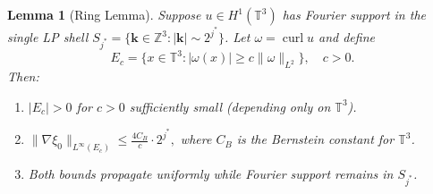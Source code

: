 \documentclass[11pt]{article}
\newtheorem{lemma}[theorem]{Lemma}
\begin{document}
\begin{lemma}[Ring Lemma]\label{lem:ring}
Suppose $u\in H^1(\mathbb{T}^3)$ has Fourier support in the single LP shell
$S_{j^*} = \{\mathbf{k}\in\mathbb{Z}^3: |\mathbf{k}|\sim 2^{j^*}\}$.
Let $\omega = \operatorname{curl} u$ and define
\[
E_c = \bigl\{x\in\mathbb{T}^3: |\omega(x)| \geq c\|\omega\|_{L^2}\bigr\},\quad c > 0.
\]
Then:
\begin{enumerate}
\item $|E_c| > 0$ for $c>0$ sufficiently small (depending only on $\mathbb{T}^3$).
\item $\displaystyle\|\nabla\xi_0\|_{L^\infty(E_c)} \leq \frac{4C_B}{c}\cdot 2^{j^*},$
      where $C_B$ is the Bernstein constant for $\mathbb{T}^3$.
\item Both bounds propagate uniformly while Fourier support remains in $S_{j^*}$.
\end{enumerate}
\end{lemma}
\end{document}
